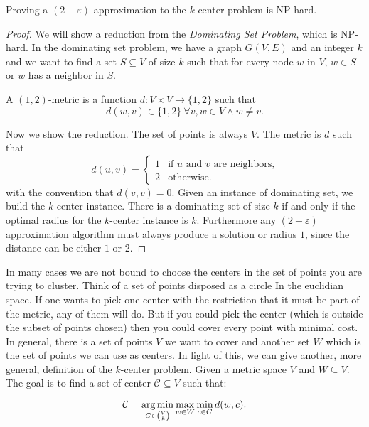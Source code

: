 \begin{thm}
	Proving a $(2-\varepsilon)$-approximation to the $k$-center problem is NP-hard.
\end{thm}
\begin{proof}
	We will show a reduction from the \emph{Dominating Set Problem}, which is NP-hard. In the dominating set problem, we have a graph $G(V, E)$ and an integer $k$ and we want to find a set $S \subseteq V$ of size $k$ such that for every node  $w$ in $V$, $w \in S$ or $w$ has a neighbor in $S$.
	
	\begin{defn}[$(1,2)$-metric]
		A $(1,2)$-metric is a function $d:V\times V \rightarrow \{1, 2\}$ such that 
		$$d(w, v) \in \{1, 2\}\ \forall v, w \in V \wedge w \neq v.$$
	\end{defn}
	
	Now we show the reduction. The set of points is always $V$. The metric is $d$ such that
	\begin{equation}
		d(u, v) = \begin{cases}
		1 & \text{if $u$ and $v$ are neighbors,}\\
		2 & \text{otherwise.}
		\end{cases}
	\end{equation}
with the convention that $d(v, v) = 0$. Given an instance of dominating set, we build the $k$-center instance. There is a dominating set of size $k$ if and only if the optimal radius for the $k$-center instance is $k$. Furthermore any $(2 -\varepsilon)$ approximation algorithm must always produce a solution or radius $1$, since the distance can be either $1$ or $2$.
\end{proof}

In many cases we are not bound to choose the centers in the set of points you are trying to cluster. Think of a set of points disposed as a circle In the euclidian space. If one wants to pick one center with the restriction that it must be part of the metric, any of them will do. But if you could pick the center (which is outside the subset of points chosen) then you could cover every point with minimal cost. In general, there is a set of points $V$ we want to cover and another set $W$ which is the set of points we can use as centers. In light of this, we can give another, more general, definition of the $k$-center problem. Given a metric space $V$ and $W \subseteq V$. The goal is to find a set of center $\mathcal{C} \subseteq V$ such that:

\begin{equation}
	\mathcal{C} = \operatorname*{arg\,min}_{C \in \binom{V}{k}} \max_{w \in W} \min_{c \in C}d(w, c).
\end{equation}

